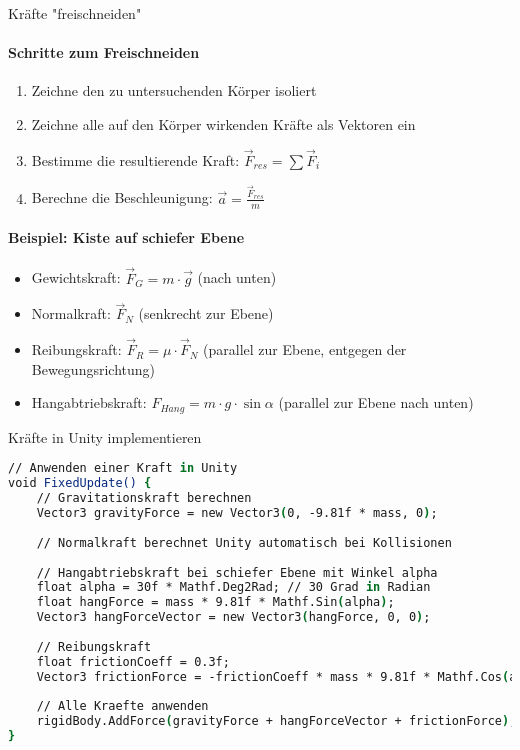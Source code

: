 \begin{KR}{Kräfte "freischneiden"}\\
    \paragraph{Schritte zum Freischneiden}
    \begin{enumerate}
        \item Zeichne den zu untersuchenden Körper isoliert
        \item Zeichne alle auf den Körper wirkenden Kräfte als Vektoren ein
        \item Bestimme die resultierende Kraft: $\vec{F}_{res} = \sum \vec{F}_i$
        \item Berechne die Beschleunigung: $\vec{a} = \frac{\vec{F}_{res}}{m}$
    \end{enumerate}
    
    \paragraph{Beispiel: Kiste auf schiefer Ebene}
    \begin{itemize}
        \item Gewichtskraft: $\vec{F}_G = m \cdot \vec{g}$ (nach unten)
        \item Normalkraft: $\vec{F}_N$ (senkrecht zur Ebene)
        \item Reibungskraft: $\vec{F}_R = \mu \cdot \vec{F}_N$ (parallel zur Ebene, entgegen der Bewegungsrichtung)
        \item Hangabtriebskraft: $F_{Hang} = m \cdot g \cdot \sin\alpha$ (parallel zur Ebene nach unten)
    \end{itemize}
\end{KR}

\begin{examplecode}{Kräfte in Unity implementieren}\\
    \begin{lstlisting}[language=csh, style=basesmol]
// Anwenden einer Kraft in Unity
void FixedUpdate() {
    // Gravitationskraft berechnen
    Vector3 gravityForce = new Vector3(0, -9.81f * mass, 0);
    
    // Normalkraft berechnet Unity automatisch bei Kollisionen
    
    // Hangabtriebskraft bei schiefer Ebene mit Winkel alpha
    float alpha = 30f * Mathf.Deg2Rad; // 30 Grad in Radian
    float hangForce = mass * 9.81f * Mathf.Sin(alpha);
    Vector3 hangForceVector = new Vector3(hangForce, 0, 0);
    
    // Reibungskraft
    float frictionCoeff = 0.3f;
    Vector3 frictionForce = -frictionCoeff * mass * 9.81f * Mathf.Cos(alpha) * rigidBody.velocity.normalized;
    
    // Alle Kraefte anwenden
    rigidBody.AddForce(gravityForce + hangForceVector + frictionForce);
}
    \end{lstlisting}
\end{examplecode}